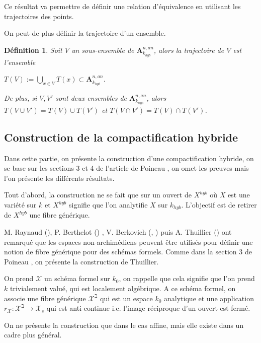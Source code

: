 \documentclass[11pt]{article}
\newcommand{\ana}{\mathbf{A}}
\newtheorem{defi}[thm]{Définition}
\begin{document}
Ce résultat va permettre de définir une relation d'équivalence en utilisant les trajectoires des points.

On peut de plus définir la trajectoire d'un ensemble. 
\begin{defi}\label{def trajectoire ensemble}
Soit $V$ un sous-ensemble de $\ana^{n,an}_{k_{hyb}}$, alors la trajectoire de $V$ est l'ensemble 
\begin{center}
$T(V) := \bigcup_{x\in V} T(x) \subset \ana^{n,an}_{k_{hyb}}$.
\end{center}

De plus, si $V, V'$ sont deux ensembles de $\ana^{n,an}_{k_{hyb}}$, alors $T(V\cup V') = T(V) \cup T(V')$ et $T(V\cap V') = T(V) \cap T(V')$.
\end{defi}

\subsection{Construction de la compactification hybride}
Dans cette partie, on présente la construction d'une compactification hybride, on se base sur les sections 3 et 4 de l'article de Poineau \cite{PoineauCompactificationHybride}, on omet les preuves mais l'on présente les différents résultats.

Tout d'abord, la construction ne se fait que sur un ouvert de $X^{hyb}$ où $X$ est une variété sur $k$ et $X^{hyb}$ signifie que l'on analytifie $X$ sur $k_{hyb}$. L'objectif est de retirer de $X^{hyb}$ une fibre générique.

M. Raynaud (\cite{RaynaudGeometrieRigide}), P. Berthelot (\cite{BerthelotLivre}) , V. Berkovich (\cite{BerkovichSchemaFormel1}, \cite{BerkovichSchemaFormel2}) puis A. Thuillier (\cite{ThuillierGeometrieToroidale}) ont remarqué que les espaces non-archimédiens peuvent être utilisés pour définir une notion de fibre générique pour des schémas formels. Comme dans la section 3 de Poineau \cite{PoineauCompactificationHybride}, on présente la construction de Thuillier.

On prend $\mathcal{X}$ un schéma formel sur $k_0$, on rappelle que cela signifie que l'on prend $k$ trivialement valué, qui est localement algébrique. A ce schéma formel, on associe une fibre générique $\mathcal{X}^\beth$ qui est un espace $k_0$ analytique et une application $r_{\mathcal{X}} : \mathcal{X}^\beth \rightarrow \mathcal{X}_s$ qui est anti-continue i.e. l'image réciproque d'un ouvert est fermé.

On ne présente la construction que dans le cas affine, mais elle existe dans un cadre plus général.
\end{document}
